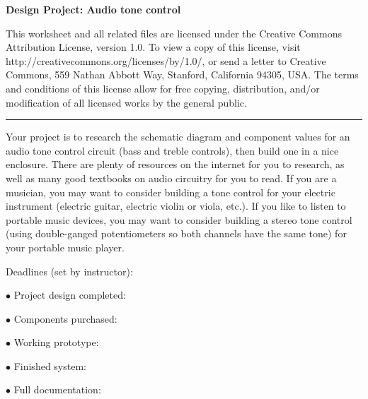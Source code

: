 
\centerline{\bf Design Project: Audio tone control} \bigskip 
 
This worksheet and all related files are licensed under the Creative Commons Attribution License, version 1.0.  To view a copy of this license, visit http://creativecommons.org/licenses/by/1.0/, or send a letter to Creative Commons, 559 Nathan Abbott Way, Stanford, California 94305, USA.  The terms and conditions of this license allow for free copying, distribution, and/or modification of all licensed works by the general public.

\bigskip 

\hrule

\vskip 10pt

Your project is to research the schematic diagram and component values for an audio tone control circuit (bass and treble controls), then build one in a nice enclosure.  There are plenty of resources on the internet for you to research, as well as many good textbooks on audio circuitry for you to read.  If you are a musician, you may want to consider building a tone control for your electric instrument (electric guitar, electric violin or viola, etc.).  If you like to listen to portable music devices, you may want to consider building a stereo tone control (using double-ganged potentiometers so both channels have the same tone) for your portable music player.

\vskip 10pt

\noindent
Deadlines (set by instructor):

\medskip
\item{$\bullet$} Project design completed: 
\item{$\bullet$} Components purchased:
\item{$\bullet$} Working prototype:
\item{$\bullet$} Finished system:
\item{$\bullet$} Full documentation:
\medskip



